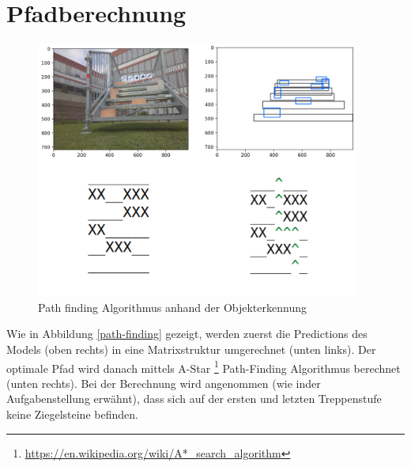 
\section{Pfadberechnung}

\begin{figure}[H]
  \includegraphics[width=0.95\textwidth]{img/CNN/path-finding}
  \caption{Path finding Algorithmus anhand der Objekterkennung}
  \label{fig:path-finding}
\end{figure}

Wie in Abbildung \ref{path-finding} gezeigt, werden zuerst die Predictions
des Models (oben rechts) in eine Matrixstruktur umgerechnet (unten links).
Der optimale Pfad wird danach mittels A-Star \footnote{\url{https://en.wikipedia.org/wiki/A*_search_algorithm}} Path-Finding
Algorithmus berechnet (unten rechts). Bei der Berechnung wird angenommen (wie inder Aufgabenstellung erwähnt),
dass sich auf der ersten und letzten Treppenstufe keine Ziegelsteine befinden.